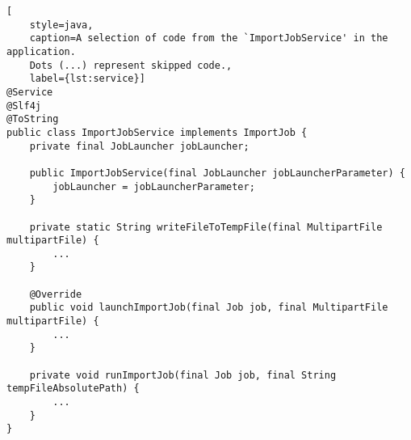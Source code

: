 \begin{lstlisting}[
    style=java,
    caption=A selection of code from the `ImportJobService' in the application.
    Dots (...) represent skipped code.,
    label={lst:service}]
@Service
@Slf4j
@ToString
public class ImportJobService implements ImportJob {
    private final JobLauncher jobLauncher;

    public ImportJobService(final JobLauncher jobLauncherParameter) {
        jobLauncher = jobLauncherParameter;
    }

    private static String writeFileToTempFile(final MultipartFile multipartFile) {
        ...
    }

    @Override
    public void launchImportJob(final Job job, final MultipartFile multipartFile) {
        ...
    }

    private void runImportJob(final Job job, final String tempFileAbsolutePath) {
        ...
    }
}
\end{lstlisting}
